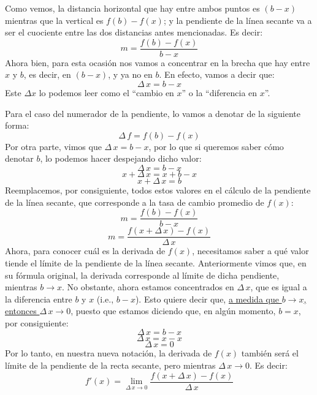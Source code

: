\documentclass[12pt]{article}
\begin{document}
Como vemos, la distancia horizontal que hay entre ambos puntos es $(b-x)$ mientras que la vertical es $f(b)-f(x)$; y la pendiente de la línea secante va a ser el cuociente entre las dos distancias antes mencionadas. Es decir:
\[m = \frac{f(b)-f(x)}{b-x}\]
Ahora bien, para esta ocasión nos vamos a concentrar en la brecha que hay entre $x$ y $b$, es decir, en $(b - x)$, y ya no en $b$. En efecto, vamos a decir que:
\[\Delta \, x = b-x\]
Este $\Delta x$ lo podemos leer como el ``cambio en $x$'' o la ``diferencia en $x$''.

Para el caso del numerador de la pendiente, lo vamos a denotar de la siguiente forma:
\[\Delta \, f = f(b) - f(x)\]
Por otra parte, vimos que $\Delta \, x = b - x$, por lo que si queremos saber cómo denotar $b$, lo podemos hacer despejando dicho valor:
\[\Delta \, x = b - x\]
\[x + \Delta \, x = x + b - x\]
\[x + \Delta \, x = b\]
Reemplacemos, por consiguiente, todos estos valores en el cálculo de la pendiente de la línea secante, que corresponde a la tasa de cambio promedio de $f(x)$:
\[m = \frac{f(b)-f(x)}{b-x}\]
\[m = \frac{f(x + \Delta \, x)-f(x)}{\Delta \, x}\]
Ahora, para conocer cuál es la derivada de $f(x)$, necesitamos saber a qué valor tiende el límite de la pendiente de la línea secante. Anteriormente vimos que, en su fórmula original, la derivada corresponde al límite de dicha pendiente, mientras  $b \to x$. No obstante, ahora estamos concentrados en $\Delta \, x$, que es igual a la diferencia entre $b$ y $x$ (i.e., $b-x$). Esto quiere decir que, \underline{a medida que $b \to x$, entonces $\Delta \, x \to 0$}, puesto que estamos diciendo que, en algún momento, $b = x$, por consiguiente:
\[\Delta \, x = b - x\]
\[\Delta \, x = x - x\]
\[\Delta \, x = 0\]
Por lo tanto, en nuestra nueva notación, la derivada de $f(x)$ también será el límite de la pendiente de la recta secante, pero mientras $\Delta \, x \to 0$. Es decir:
\[f'(x) = \lim_{\Delta \, x \to 0} \frac{f(x + \Delta \, x)-f(x)}{\Delta \, x}\]

\newpage
\end{document}
